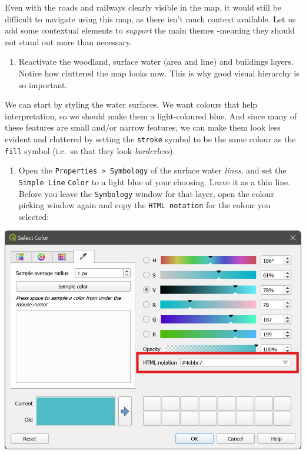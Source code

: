 \documentclass[
  letterpaper,
  DIV=11,
  numbers=noendperiod]{scrreprt}
\providecommand{\tightlist}{%
  \setlength{\itemsep}{0pt}\setlength{\parskip}{0pt}}\usepackage{longtable,booktabs,array}
\begin{document}
Even with the roads and railways clearly visible in the map, it would
still be difficult to navigate using this map, as there isn't much
context available. Let us add some contextual elements to \emph{support}
the main themes -meaning they should not stand out more than necessary.

\begin{enumerate}
\def\labelenumi{(\arabic{enumi})}
\setcounter{enumi}{210}
\tightlist
\item
  Reactivate the woodland, surface water (area and line) and buildings
  layers. Notice how cluttered the map looks now. This is why good
  visual hierarchy is so important.
\end{enumerate}

We can start by styling the water surfaces. We want colours that help
interpretation, so we should make them a light-coloured blue. And since
many of these features are small and/or narrow features, we can make
them look less evident and cluttered by setting the \texttt{stroke}
symbol to be the same colour as the \texttt{fill} symbol (i.e.~so that
they look \emph{borderless}).

\begin{enumerate}
\def\labelenumi{(\arabic{enumi})}
\setcounter{enumi}{211}
\tightlist
\item
  Open the \texttt{Properties\ \textgreater{}\ Symbology} of the surface
  water \emph{lines}, and set the \texttt{Simple\ Line} \texttt{Color}
  to a light blue of your choosing. Leave it as a thin line. Before you
  leave the \texttt{Symbology} window for that layer, open the colour
  picking window again and copy the \texttt{HTML\ notation} for the
  colour you selected:
\end{enumerate}

\includegraphics{images/lab_7/lab7_fig11_copycolour.jpg}
\end{document}
